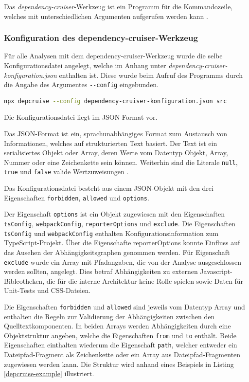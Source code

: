 Das \emph{dependency-cruiser}-Werkzeug ist ein Programm für die Kommandozeile, welches mit unterschiedlichen Argumenten aufgerufen werden kann \autocite[vgl.][]{Verweij:CLI}.

\subsubsection{Konfiguration des {dependency-cruiser}-Werkzeug}
Für alle Analysen mit dem dependency-cruiser-Werkzeug wurde die selbe Konfigurationsdatei angelegt, welche im Anhang unter \emph{dependency-cruiser-konfiguration.json} enthalten ist. Diese wurde beim Aufruf des Programms durch die Angabe des Argumentes \lstinline|--config| eingebunden.
\begin{lstlisting}[language={sh},label=depcruise-config, caption=Aufruf des \emph{dependency-cruiser} mit eingebundener Konfigurationsdatei]
    npx depcruise --config dependency-cruiser-konfiguration.json src
\end{lstlisting}
Die Konfigurationsdatei liegt im JSON-Format vor. 

Das JSON-Format ist ein, sprachunabhängiges Format zum Austausch von Informationen, welches auf strukturierten Text basiert. Der Text ist ein serialisiertes Objekt oder Array, deren Werte vom Datentyp Objekt, Array, Nummer oder eine Zeichenkette sein können. Weiterhin sind die Literale \lstinline|null|, \lstinline|true| und \lstinline|false| valide Wertzuweisungen \autocite[vgl.][]{JSON:Einführung}.  

Das Konfigurationsdatei besteht aus einem JSON-Objekt mit den drei Eigenschaften \lstinline|forbidden|, \lstinline|allowed| und \lstinline|options|.

Der Eigenschaft \lstinline|options| ist ein Objekt zugewiesen mit den Eigenschaften 
\lstinline|tsConfig|, 
\lstinline|webpackConfig|, 
\lstinline|reporterOptions| und 
\lstinline|exclude|. Die Eigenschaften \lstinline|tsConfig| und \lstinline|webpackConfig| enthalten Konfigurationsinformation zum TypeScript-Projekt. Über die Eigenschafte reporterOptions konnte Einfluss auf das Ausehen der Abhängigkeitsgraphen genommen werden. Für Eigenschaft \lstinline|exclude| wurde ein Array mit Pfadangaben, die von der Analyse ausgeschlossen werden sollten, angelegt. Dies betraf Abhängigkeiten zu externen Javascript-Bibleotheken, die für die interne Architektur keine Rolle spielen sowie Daten für Unit-Tests und CSS-Dateien. 

Die Eigenschaften \lstinline|forbidden| und \lstinline|allowed| sind jeweils vom Datentyp Array und enthalten die Regeln zur Validierung der Abhängigkeiten zwischen den Quelltextkomponenten. 
In beiden Arrays werden Abhängigkeiten durch eine Objektstruktur angeben, welche die Eigenschaften \lstinline|from| und \lstinline|to| enthält. Beide Eigenschaften einthalten wiederum die Eigenschaft \lstinline|path|, welcher entweder ein Dateipfad-Fragment als Zeichenkette oder ein Array aus Dateipfad-Fragmenten zugewiesen werden kann. Die Struktur wird anhand eines Beispiels in Listing \ref{depcruise-example} illustriert.

